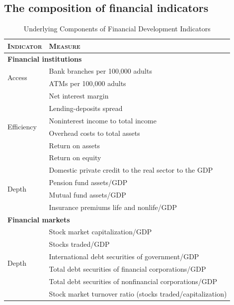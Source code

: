 \documentclass[a4paper,11pt]{article}
\begin{document}
\subsection*{The composition of financial indicators}
\label{subsec:finind_comp}
\begin{table}[ht!]
    \small
    \caption{Underlying Components of Financial Development Indicators}
    \label{tab:finind}
    \centering
    \begin{tabular}{ll}
      \toprule
      \textsc{Indicator} & \textsc{Measure} \\
      \midrule
      \multicolumn{2}{l}{\textbf{Financial institutions}} \\
      \midrule
      \multirow{2}{*}{Access} 	& Bank branches per 100,000 adults \\
                                  & ATMs per 100,000 adults \\
      \midrule
      \multirow{6}{*}{Efficiency}		& Net interest margin \\
                                  & Lending-deposits spread \\ 
                                  & Noninterest income to total income \\
                                  & Overhead costs to total assets \\
                                  & Return on assets \\
                                  & Return on equity \\
            
      \midrule
      \multirow{4}{*}{Depth}	& Domestic private credit to the real sector to the GDP \\
                                  & Pension fund assets/GDP \\
                                  & Mutual fund assets/GDP \\
                                  & Insurance premiums life and nonlife/GDP \\
      \midrule
      \multicolumn{2}{l}{\textbf{Financial markets}} \\
      \midrule
      \multirow{6}{*}{Depth} 	& Stock market capitalization/GDP \\
                                  & Stocks traded/GDP \\
                                  & International debt securities of government/GDP \\
                                  & Total debt securities of financial corporations/GDP \\
                                  & Total debt securities of nonfinancial corporations/GDP \\
      \midrule
      Efficiency                  & Stock market turnover ratio (stocks traded/capitalization) \\
      \bottomrule
    \end{tabular}
\end{table}
\end{document}

